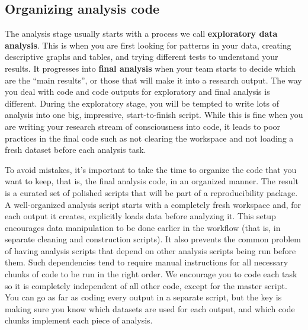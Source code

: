 \documentclass[
]{book}
\begin{document}
\hypertarget{organizing-analysis-code}{%
\subsection*{Organizing analysis code}\label{organizing-analysis-code}}

The analysis stage usually starts with a process we call \textbf{exploratory data analysis}.
This is when you are first looking for patterns in your data,
creating descriptive graphs and tables,
and trying different tests to understand your results.
It progresses into \textbf{final analysis} when your team starts to decide which are the ``main results'',
or those that will make it into a research output.
The way you deal with code and code outputs for exploratory and final analysis is different.
During the exploratory stage,
you will be tempted to write lots of analysis into one big, impressive, start-to-finish script.
While this is fine when you are writing your research stream of consciousness into code,
it leads to poor practices in the final code such as not clearing the workspace
and not loading a fresh dataset before each analysis task.

To avoid mistakes, it's important to take the time
to organize the code that you want to keep, that is,
the final analysis code, in an organized manner.
The result is a curated set of polished scripts that
will be part of a reproducibility package.
A well-organized analysis script starts with a completely fresh workspace
and, for each output it creates, explicitly loads data before analyzing it.
This setup encourages data manipulation to be done earlier in the workflow
(that is, in separate cleaning and construction scripts).
It also prevents the common problem of having analysis scripts
that depend on other analysis scripts being run before them.
Such dependencies tend to require manual instructions
for all necessary chunks of code to be run in the right order.
We encourage you to code each task so
it is completely independent of all other code,
except for the master script.
You can go as far as coding every output in a separate script,
but the key is making sure you know which datasets are used for each output,
and which code chunks implement each piece of analysis.
\end{document}

